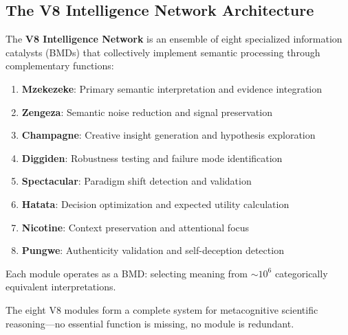 \subsection{The V8 Intelligence Network Architecture}

\begin{definition}
The \textbf{V8 Intelligence Network} is an ensemble of eight specialized information catalysts (BMDs) that collectively implement semantic processing through complementary functions:

\begin{enumerate}
\item \textbf{Mzekezeke}: Primary semantic interpretation and evidence integration
\item \textbf{Zengeza}: Semantic noise reduction and signal preservation
\item \textbf{Champagne}: Creative insight generation and hypothesis exploration
\item \textbf{Diggiden}: Robustness testing and failure mode identification
\item \textbf{Spectacular}: Paradigm shift detection and validation
\item \textbf{Hatata}: Decision optimization and expected utility calculation
\item \textbf{Nicotine}: Context preservation and attentional focus
\item \textbf{Pungwe}: Authenticity validation and self-deception detection
\end{enumerate}

Each module operates as a BMD: selecting meaning from $\sim 10^6$ categorically equivalent interpretations.
\end{definition}

\begin{theorem}
\label{thm:v8_completeness}
The eight V8 modules form a complete system for metacognitive scientific reasoning—no essential function is missing, no module is redundant.
\end{theorem}

